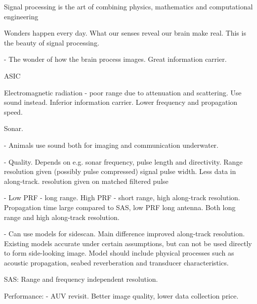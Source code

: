 Signal processing is the art of combining physics, mathematics and computational engineering 

Wonders happen every day. What our senses reveal our brain make real. This is the beauty of signal processing.

- The wonder of how the brain process images. Great information carrier.

\gls{ASIC}

Electromagnetic radiation - poor range due to attenuation and scattering. Use sound instead. Inferior information carrier. Lower frequency and propagation speed.

Sonar. 

- Animals use sound both for imaging and communication underwater.

- Quality. Depends on e.g. sonar frequency, pulse length and directivity. Range resolution given (possibly pulse compressed) signal pulse width. Less data in along-track. resolution given on matched filtered pulse 

- Low PRF - long range. High PRF - short range, high along-track resolution. Propagation time large compared to  SAS, low PRF long antenna. Both long range and high along-track resolution.

- Can use models for sidescan. Main difference improved along-track resolution. Existing models accurate under certain assumptions, but can not be used directly to form side-looking image. Model should include physical processes such as acoustic propagation, seabed reverberation and transducer characteristics.

SAS: Range and frequency independent resolution.


Performance:
- AUV revisit. Better image quality, lower data collection price.

